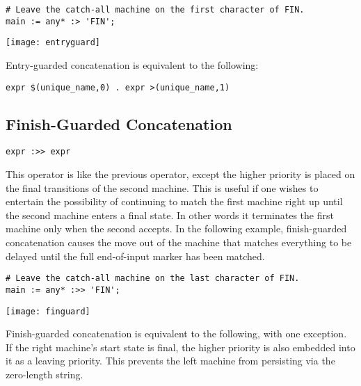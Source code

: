 \documentclass[letterpaper,11pt,oneside]{book}
\newcommand{\verbspace}{\vspace{10pt}}
\newcommand{\graphspace}{\vspace{10pt}}
\newenvironment{inline_code}{\def\baselinestretch{1}\vspace{12pt}\small}{}
\begin{document}
\begin{inline_code}
\begin{verbatim}
# Leave the catch-all machine on the first character of FIN.
main := any* :> 'FIN';
\end{verbatim}
\end{inline_code}

\begin{center}
\texttt{[image: entryguard]}
\end{center}
\graphspace

Entry-guarded concatenation is equivalent to the following:

\verbspace
\begin{verbatim}
expr $(unique_name,0) . expr >(unique_name,1)
\end{verbatim}

\subsection{Finish-Guarded Concatenation}

\verb|expr :>> expr|
\verbspace

This operator is
like the previous operator, except the higher priority is placed on the final
transitions of the second machine. This is useful if one wishes to entertain
the possibility of continuing to match the first machine right up until the
second machine enters a final state. In other words it terminates the first
machine only when the second accepts. In the following example, finish-guarded
concatenation causes the move out of the machine that matches everything to be
delayed until the full end-of-input marker has been matched.

\begin{inline_code}
\begin{verbatim}
# Leave the catch-all machine on the last character of FIN.
main := any* :>> 'FIN';
\end{verbatim}
\end{inline_code}

\begin{center}
\texttt{[image: finguard]}
\end{center}
\graphspace

Finish-guarded concatenation is equivalent to the following, with one
exception. If the right machine's start state is final, the higher priority is
also embedded into it as a leaving priority. This prevents the left machine
from persisting via the zero-length string.
\end{document}
